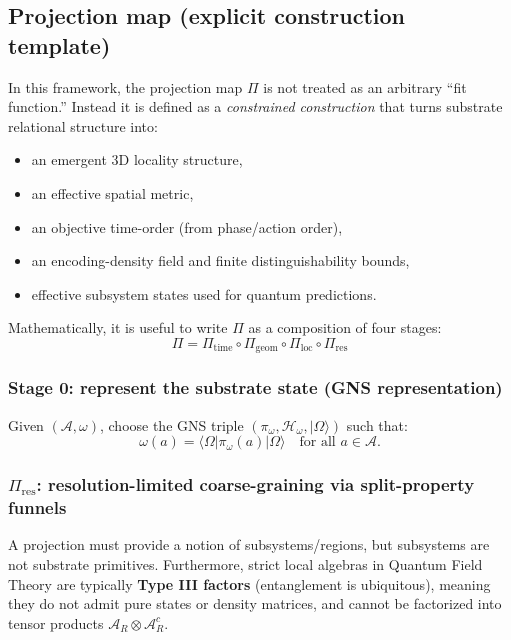 \documentclass[reprint, amsmath, amssymb, aps, prd]{revtex4-2}
\begin{document}
\subsection{Projection map (explicit construction template)}
In this framework, the projection map $\Pi$ is not treated as an arbitrary ``fit function.'' Instead it is defined as a \textit{constrained construction} that turns substrate relational structure into:
\begin{itemize}
    \item an emergent 3D locality structure,
    \item an effective spatial metric,
    \item an objective time-order (from phase/action order),
    \item an encoding-density field and finite distinguishability bounds,
    \item effective subsystem states used for quantum predictions.
\end{itemize}

Mathematically, it is useful to write $\Pi$ as a composition of four stages:
\begin{equation}
\Pi = \Pi_{\text{time}} \circ \Pi_{\text{geom}} \circ \Pi_{\text{loc}} \circ \Pi_{\text{res}}
\end{equation}

\subsubsection{Stage 0: represent the substrate state (GNS representation)}
Given $(\mathcal{A}, \omega)$, choose the GNS triple $(\pi_\omega, \mathcal{H}_\omega, |\Omega\rangle)$ such that:
\begin{equation}
\omega(a) = \langle\Omega | \pi_\omega(a) | \Omega\rangle \quad \text{for all } a \in \mathcal{A}.
\end{equation}

\subsubsection{\texorpdfstring{$\Pi_{\text{res}}$}{Pi\_res}: resolution-limited coarse-graining via split-property funnels}
A projection must provide a notion of subsystems/regions, but subsystems are not substrate primitives. Furthermore, strict local algebras in Quantum Field Theory are typically \textbf{Type III factors} (entanglement is ubiquitous), meaning they do not admit pure states or density matrices, and cannot be factorized into tensor products $\mathcal{A}_R \otimes \mathcal{A}_R^c$.
\end{document}
